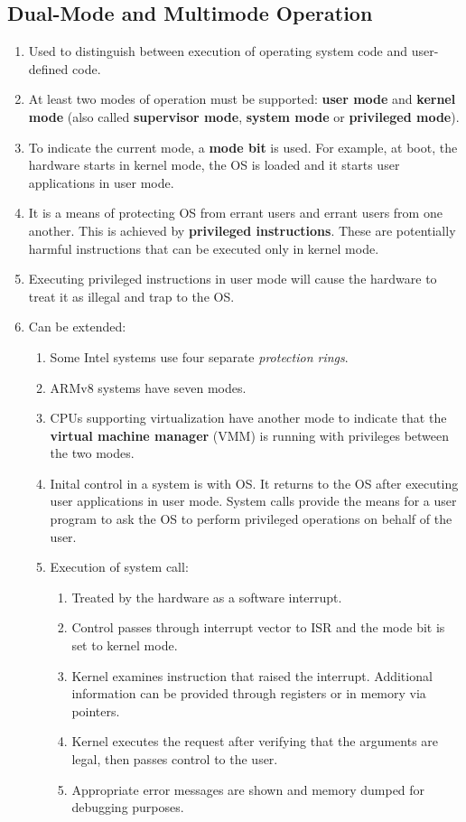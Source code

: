 \documentclass[journal,12pt,twocolumn]{IEEEtran}
\begin{document}
\subsection{Dual-Mode and Multimode Operation}
\begin{enumerate}
    \item Used to distinguish between execution of operating system code and 
    user-defined code.
    \item At least two modes of operation must be supported: \textbf{user mode}
    and \textbf{kernel mode} (also called \textbf{supervisor mode},  
    \textbf{system mode} or \textbf{privileged mode}).
    \item To indicate the current mode, a \textbf{mode bit} is used. For example,
    at boot, the hardware starts in kernel mode, the OS is loaded and it starts 
    user applications in user mode.
    \item It is a means of protecting OS from errant users and errant users from 
    one another. This is achieved by \textbf{privileged instructions}. These are 
    potentially harmful instructions that can be executed only in kernel mode.
    \item Executing privileged instructions in user mode will cause the hardware 
    to treat it as illegal and trap to the OS.
    \item Can be extended:
    \begin{enumerate}
        \item Some Intel systems use four separate \textit{protection rings}.
        \item ARMv8 systems have seven modes.
        \item CPUs supporting virtualization have another mode to indicate that
        the \textbf{virtual machine manager} (VMM) is running with privileges 
        between the two modes.
        \item Inital control in a system is with OS. It returns to the OS after 
        executing user applications in user mode. System calls provide the means 
        for a user program to ask the OS to perform privileged operations on 
        behalf of the user.
        \item Execution of system call:
        \begin{enumerate}
            \item Treated by the hardware as a software interrupt.
            \item Control passes through interrupt vector to ISR and the mode 
            bit is set to kernel mode.
            \item Kernel examines instruction that raised the interrupt.
            Additional information can be provided through registers or in 
            memory via pointers.
            \item Kernel executes the request after verifying that the arguments 
            are legal, then passes control to the user.
            \item Appropriate error messages are shown and memory dumped for
            debugging purposes.
        \end{enumerate}
    \end{enumerate}
\end{enumerate}
\end{document}
